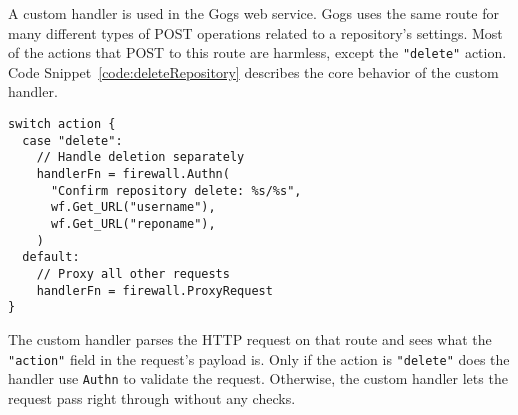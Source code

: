A custom handler is used in the Gogs web service. Gogs uses the same route for many different types of POST operations related to a repository's settings. Most of the actions that POST to this route are harmless, except the \lstinline{"delete"} action. Code Snippet~\ref{code:deleteRepository} describes the core behavior of the custom handler.

\begin{lstlisting}[float=h,label=code:deleteRepository,caption=The switch/case logic necessary to determine which requests need transaction authentication and which can pass through without any validation. Only requests corresponding to delete repository operations are authenticated.] 
switch action {
  case "delete":
    // Handle deletion separately
    handlerFn = firewall.Authn(
      "Confirm repository delete: %s/%s",
      wf.Get_URL("username"),
      wf.Get_URL("reponame"),
    )
  default:
    // Proxy all other requests
    handlerFn = firewall.ProxyRequest
}
\end{lstlisting}

The custom handler parses the HTTP request on that route and sees what the \lstinline{"action"} field in the request's payload is. Only if the action is \lstinline{"delete"} does the handler use \lstinline{Authn} to validate the request. Otherwise, the custom handler lets the request pass right through without any checks.







